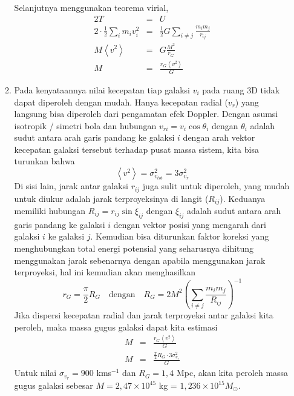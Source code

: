 \documentclass[11pt,fleqn]{exam}
\begin{document}
\begin{questions}
\begin{enumerate}[a.]
\begin{enumerate}[i]
        Selanjutnya menggunakan teorema virial,
        \begin{eqnarray*}
            2 T &=& U\\
            2 \cdot \frac{1}{2} \sum_i m_i v_i^2 &=& \frac{1}{2} G \sum_{i \neq j} \frac{m_i m_j}{r_{ij}}\\
            M \left< v^2 \right> &=& G \frac{M^2}{r_G}\\
            M &=& \frac{r_G \left< v^2 \right>}{G}
        \end{eqnarray*}

        \item Pada kenyataannya nilai kecepatan tiap galaksi $v_i$ pada ruang 3D tidak dapat diperoleh dengan mudah. Hanya kecepatan radial ($v_r$) yang langsung bisa diperoleh dari pengamatan efek Doppler. Dengan asumsi isotropik / simetri bola dan hubungan $v_{ri} = v_i \cos{\theta_i}$ dengan $\theta_i$ adalah sudut antara arah garis pandang ke galaksi $i$ dengan arah vektor kecepatan galaksi tersebut terhadap pusat massa sistem, kita bisa turunkan bahwa 
        $$\left< v^2 \right> = \sigma^2_{v_{tot}} = 3 \sigma_{v_{r}}^2$$
        Di sisi lain, jarak antar galaksi $r_{ij}$ juga sulit untuk diperoleh, yang mudah untuk diukur adalah jarak terproyeksinya di langit ($R_{ij}$). Keduanya memiliki hubungan $R_{ij} = r_{ij} \sin{\xi_{ij}}$ dengan $\xi_{ij}$ adalah sudut antara arah garis pandang ke galaksi $i$ dengan vektor posisi yang mengarah dari galaksi $i$ ke galaksi $j$. Kemudian bisa diturunkan faktor koreksi yang menghubungkan total energi potensial yang seharusnya dihitung menggunakan jarak sebenarnya dengan apabila menggunakan jarak terproyeksi, hal ini kemudian akan menghasilkan
        $$r_G = \frac{\pi}{2} R_G \quad \text{dengan} \quad R_G = 2M^2 \left( \sum_{i \neq j} \frac{m_i m_j}{R_{ij}} \right)^{-1}$$
        Jika dispersi kecepatan radial dan jarak terproyeksi antar galaksi kita peroleh, maka massa gugus galaksi dapat kita estimasi
        \begin{eqnarray*}
            M &=& \frac{r_G \left< v^2 \right>}{G} \\
            M &=& \frac{\frac{\pi}{2} R_G \cdot 3 \sigma_{v_r}^2}{G}
        \end{eqnarray*}
        Untuk nilai $\sigma_{v_r} = 900$ kms$^{-1}$ dan $R_G = 1,4$ Mpc, akan kita peroleh massa gugus galaksi sebesar $M = 2,47 \times 10^{45}$ kg = $1,236 \times 10^{15} M_\odot$.
    \end{enumerate}
    

\end{enumerate}
\end{questions}
\end{document}

